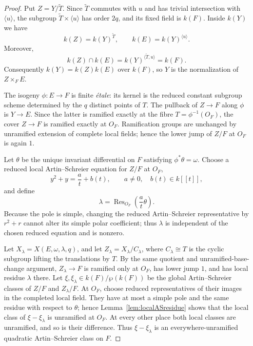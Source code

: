 \documentclass[11pt]{article}
\theoremstyle{remark}
\newcommand{\Res}{\operatorname{Res}}
\begin{document}
\begin{proof}
Put $Z=Y/\widetilde T$.  Since $\widetilde T$ commutes with $u$ and has
trivial intersection with $\langle u\rangle$, the subgroup
$\widetilde T\times\langle u\rangle$ has order $2q$, and its fixed field
is $k(F)$.  Inside $k(Y)$ we have
\[
 k(Z)=k(Y)^{\widetilde T},\qquad k(E)=k(Y)^{\langle u\rangle}.
\]
Moreover,
\[
 k(Z)\cap k(E)
   =k(Y)^{\langle\widetilde T,u\rangle}=k(F).
\]
Consequently $k(Y)=k(Z)k(E)$ over $k(F)$, so $Y$ is the normalization of
$Z\times_F E$.

The isogeny $\phi:E\to F$ is finite \emph{\'etale}: its kernel is the reduced
constant subgroup scheme determined by the $q$ distinct points of $T$.
The pullback of
$Z\to F$ along $\phi$ is $Y\to E$.  Since the latter is ramified exactly
at the fibre $T=\phi^{-1}(O_F)$, the cover $Z\to F$ is ramified exactly
at $O_F$.  Ramification groups are unchanged by unramified extension of
complete local fields; hence the lower jump of $Z/F$ at $O_F$ is again
$1$.

Let $\theta$ be the unique invariant differential on $F$ satisfying
$\phi^*\theta=\omega$.  Choose a reduced local Artin--Schreier equation
for $Z/F$ at $O_F$,
\[
        y^2+y=\frac{a}{t}+b(t),\qquad a\ne0,\quad b(t)\in k[[t]],
\]
and define
\[
        \lambda=\Res_{O_F}\!\left(\frac{a}{t}\theta\right).
\]
Because the pole is simple, changing the reduced Artin--Schreier
representative by $r^2+r$ cannot alter its simple polar coefficient;
thus $\lambda$ is independent of the chosen reduced equation and is
nonzero.

Let $X_\lambda=X(E,\omega,\lambda,q)$, and let
$Z_\lambda=X_\lambda/C_\lambda$, where $C_\lambda\cong T$ is the cyclic
subgroup lifting the translations by $T$.  By the same quotient and
unramified-base-change argument, $Z_\lambda\to F$ is ramified only at
$O_F$, has lower jump $1$, and has local residue $\lambda$ there.
Let $\xi,\xi_\lambda\in k(F)/\wp(k(F))$ be the global
Artin--Schreier classes of $Z/F$ and $Z_\lambda/F$.  At $O_F$, choose
reduced representatives of their images in the completed local field.
They have at most a simple pole and the same residue with respect to
$\theta$; hence Lemma~\ref{lem:localASresidue} shows that the local
class of $\xi-\xi_\lambda$ is unramified at $O_F$.  At every other
place both local classes are unramified, and so is their difference.
Thus $\xi-\xi_\lambda$ is an everywhere-unramified quadratic
Artin--Schreier class on $F$.


\end{proof}
\end{document}
